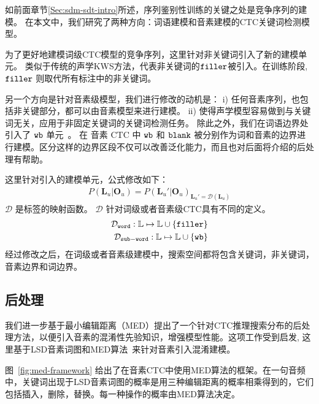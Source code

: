 如前面章节\ref{Sec:sdm-sdt-intro}所述，序列鉴别性训练的关键之处是竞争序列的建模。
在本文中，我们研究了两种方向：词语建模和音素建模的CTC关键词检测模型。

为了更好地建模词级CTC模型的竞争序列，这里针对非关键词引入了新的建模单元。
类似于传统的声学KWS方法，代表非关键词的$\tt filler$被引入。在训练阶段, $\tt filler$ 则取代所有标注中的非关键词。

另一个方向是针对音素级模型，我们进行修改的动机是：
i) 任何音素序列，也包括非关键部分，都可以由音素模型来进行建模。
ii) 使得声学模型容易做到与关键词无关，应用于非固定关键词的关键词检测任务。
%
除此之外，我们在词语边界处引入了 $\tt wb$ 单元~\cite{zhuang-is2016}。 在 音素 CTC 中 $\tt wb$ 和 $\tt blank$ 被分别作为词和音素的边界进行建模。区分这样的边界区段不仅可以改善泛化能力，而且也对后面将介绍的后处理有帮助。

这里针对引入的建模单元，公式修改如下：
\begin{equation}
\label{equ:ctc-kw}
\begin{split}
P(\mathbf{L}_u|\mathbf{O}_u)=P(\mathbf{L}_u'|\mathbf{O}_u)_{\mathbf{L}_u' = \mathcal{D}(\mathbf{L}_u)}
\end{split}
\end{equation}
$\mathcal{D}$ 是标签的映射函数。 $\mathcal{D}$ 针对词级或者音素级CTC具有不同的定义。
\begin{equation}
\label{equ:ctc-d}
\begin{split}
\mathcal{D}_{\tt{word}}:\mathbb{L}  \mapsto \mathbb{L}  \cup \{{\tt filler}\}\\
\mathcal{D}_{\tt{sub-word}}:\mathbb{L}  \mapsto \mathbb{L}  \cup \{{\tt wb}\}
\end{split}
\end{equation}
经过修改之后，在词级或者音素级建模中，搜索空间都将包含关键词，非关键词，音素边界和词边界。

\subsection{后处理}
\label{Sec:post-process-ctc}

我们进一步基于最小编辑距离（MED）提出了一个针对CTC推理搜索分布的后处理方法，以便引入音素的混淆性先验知识，增强模型性能。这项工作受到\cite{chaudhari2007improvements}启发, 这里基于LSD音素词图和MED算法~\cite{7736093}来针对音素引入混淆建模。 

图~\ref{fig:med-framework} 给出了在音素CTC中使用MED算法的框架。在一句音频中，关键词出现于LSD音素词图的概率是用三种编辑距离的概率相乘得到的，它们包括插入，删除，替换。每一种操作的概率由MED算法决定。



